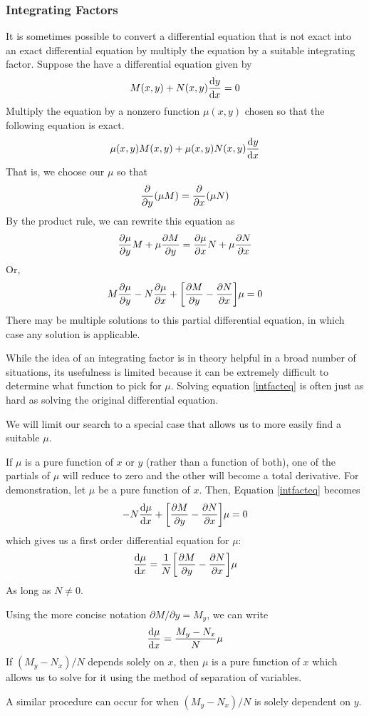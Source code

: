 \subsubsection{Integrating Factors}
It is sometimes possible to convert a differential equation that is not exact into an exact differential equation by multiply the equation by a suitable integrating factor. Suppose the have a differential equation given by 
\[ M(x,y) + N(x,y)\dv{y}{x} = 0 \]
Multiply the equation by a nonzero function $\mu(x,y)$ chosen so that the following equation is exact.
\[ \mu(x,y)M(x,y) + \mu(x,y)N(x,y)\dv{y}{x} \]
That is, we choose our $\mu$ so that 
\[ \pdv{y} \pqty{\mu M} = \pdv{x} \pqty{\mu N} \]
By the product rule, we can rewrite this equation as
\[ \pdv{\mu}{y}M + \mu \pdv{M}{y} = \pdv{\mu}{x}N + \mu\pdv{N}{x} \]
Or,
\begin{equation} \label{intfacteq}
    M\pdv{\mu}{y} - N\pdv{\mu}{x} + \bqty{\pdv{M}{y} - \pdv{N}{x}}\mu = 0
\end{equation}
There may be multiple solutions to this partial differential equation, in which case any solution is applicable. \par
While the idea of an integrating factor is in theory helpful in a broad number of situations, its usefulness is limited because it can be extremely difficult to determine what function to pick for $\mu$. Solving equation \ref{intfacteq} is often just as hard as solving the original differential equation. \par
We will limit our search to a special case that allows us to more easily find a suitable $\mu$. \par 
If $\mu$ is a pure function of $x$ or $y$ (rather than a function of both), one of the partials of $\mu$ will reduce to zero and the other will become a total derivative. For demonstration, let $\mu$ be a pure function of $x$. Then, Equation \ref{intfacteq} becomes
\[ -N\dv{\mu}{x} + \bqty{\pdv{M}{y} - \pdv{N}{x}}\mu = 0\]
which gives us a first order differential equation for $\mu$:
\[ \dv{\mu}{x} = \frac{1}{N} \bqty{\pdv{M}{y} - \pdv{N}{x}}\mu \]
As long as $N\neq 0$.\par 
Using the more concise notation $\partial M/\partial y = M_y$, we can write
\[ \dv{\mu}{x} = \frac{M_y-N_x}{N}\mu \]
If $(M_y-N_x)/N$ depends solely on $x$, then $\mu$ is a pure function of $x$ which allows us to solve for it using the method of separation of variables. \par
A similar procedure can occur for when $(M_y-N_x)/N$ is solely dependent on $y$.
